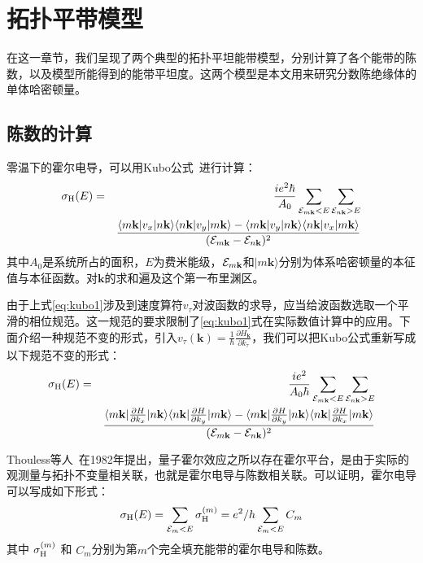 \chapter{拓扑平带模型}
\label{sec:models}
在这一章节，我们呈现了两个典型的拓扑平坦能带模型，分别计算了各个能带的陈数，以及模型所能得到的能带平坦度。这两个模型是本文用来研究分数陈绝缘体的单体哈密顿量。


\section{陈数的计算}
零温下的霍尔电导，可以用Kubo公式~\cite{Thouless1982}进行计算：
\begin{eqnarray}
    \sigma_{\rm
H}({E})&=&\frac{{i}e^{2}\hbar}{{A}_0}\sum_{{\cal
E}_{{m\mathbf{k}}}<E}\sum_{{\cal E}_{{n\mathbf{k}}}>E}\nonumber\\%
&&\frac{\langle{m\mathbf{k}}|{v}_{{x}}|{n\mathbf{k}}\rangle\langle{n\mathbf{k}}|{v}_{{y}}|{m\mathbf{k}}\rangle
-\langle{m\mathbf{k}}|{v}_{{y}}|{n\mathbf{k}}\rangle\langle{n\mathbf{k}}|{v}_{{x}}|{m\mathbf{k}}\rangle}{({\cal
E}_{{m\mathbf{k}}}-{\cal E}_{{n\mathbf{k}}})^{2}}
\label{eq:kubo1}
\end{eqnarray}
其中$A_{0}$是系统所占的面积，$E$为费米能级，${\cal E}_{m\mathbf{k}}$和$|m\mathbf{k}\rangle$分别为体系哈密顿量的本征值与本征函数。对$\mathbf{k}$的求和遍及这个第一布里渊区。

由于上式\ref{eq:kubo1}涉及到速度算符$v_{\tau}$对波函数的求导，应当给波函数选取一个平滑的相位规范。这一规范的要求限制了\ref{eq:kubo1}式在实际数值计算中的应用。下面介绍一种规范不变的形式，引入$v_{\tau}(\mathbf{k})=\frac{1}{\hbar}\frac{\partial{H_{\mathbf{k}}}}{\partial{k_{\tau}}}$，我们可以把Kubo公式重新写成以下规范不变的形式：
\begin{eqnarray}
    \sigma_{\rm
H}({E})&=&\frac{{i}e^{2}}{{A}_0\hbar}\sum_{{\cal
E}_{{m\mathbf{k}}}<E}\sum_{{\cal E}_{{n\mathbf{k}}}>E}\nonumber\\%
&&\frac{\langle{m\mathbf{k}}|\frac{\partial{H}}{\partial{k_{x}}}|{n\mathbf{k}}\rangle\langle{n\mathbf{k}}|\frac{\partial{H}}{\partial{k_{y}}}|{m\mathbf{k}}\rangle
-\langle{m\mathbf{k}}|\frac{\partial{H}}{\partial{k_{y}}}|{n\mathbf{k}}\rangle\langle{n\mathbf{k}}|\frac{\partial{H}}{\partial{k_{x}}}|{m\mathbf{k}}\rangle}{({\cal
E}_{{m\mathbf{k}}}-{\cal E}_{{n\mathbf{k}}})^{2}}
\label{eq:kubo2}
\end{eqnarray}

Thouless等人~\cite{Thouless1982}在1982年提出，量子霍尔效应之所以存在霍尔平台，是由于实际的观测量与拓扑不变量相关联，也就是霍尔电导与陈数相关联。可以证明，霍尔电导可以写成如下形式：
\begin{equation*}
    \sigma_{\rm
H}({E})=\sum_{{\cal E}_{{m}}<E}\sigma_{\rm
H}^{(m)}=e^{2}/{h}\sum_{{\cal E}_{{m}}<E}C_{m}
\end{equation*}
其中 $\sigma_{\rm
H}^{(m)}$ 和 $C_{m}$分别为第$m$个完全填充能带的霍尔电导和陈数。


